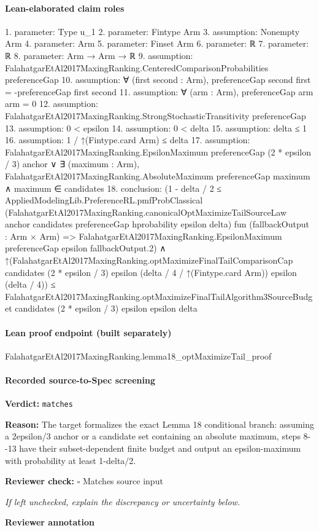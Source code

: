 \documentclass[10pt]{article}
\newcommand{\reviewerbox}{%
  \par\noindent\fbox{\parbox{0.96\linewidth}{\rule{0pt}{0.38in}}}\par
}
\newcommand{\reviewmatch}[1]{%
  \par\noindent\textbf{Reviewer check:} $\square$\; #1\par
  \noindent\emph{If left unchecked, explain the discrepancy or uncertainty below.}\par
}
\begin{document}
\paragraph{Lean-elaborated claim roles}\begin{ReviewVerbatim}
1. parameter: Type u_1
2. parameter: Fintype Arm
3. assumption: Nonempty Arm
4. parameter: Arm
5. parameter: Finset Arm
6. parameter: ℝ
7. parameter: ℝ
8. parameter: Arm → Arm → ℝ
9. assumption: FalahatgarEtAl2017MaxingRanking.CenteredComparisonProbabilities preferenceGap
10. assumption: ∀ (first second : Arm), preferenceGap second first = -preferenceGap first second
11. assumption: ∀ (arm : Arm), preferenceGap arm arm = 0
12. assumption: FalahatgarEtAl2017MaxingRanking.StrongStochasticTransitivity preferenceGap
13. assumption: 0 < epsilon
14. assumption: 0 < delta
15. assumption: delta ≤ 1
16. assumption: 1 / ↑(Fintype.card Arm) ≤ delta
17. assumption: FalahatgarEtAl2017MaxingRanking.EpsilonMaximum preferenceGap (2 * epsilon / 3) anchor ∨
  ∃ (maximum : Arm), FalahatgarEtAl2017MaxingRanking.AbsoluteMaximum preferenceGap maximum ∧ maximum ∈ candidates
18. conclusion: (1 - delta / 2 ≤
    AppliedModelingLib.PreferenceRL.pmfProbClassical
      (FalahatgarEtAl2017MaxingRanking.canonicalOptMaximizeTailSourceLaw anchor candidates preferenceGap hprobability
        epsilon delta)
      fun (fallbackOutput : Arm × Arm) =>
      FalahatgarEtAl2017MaxingRanking.EpsilonMaximum preferenceGap epsilon fallbackOutput.2) ∧
  ↑(FalahatgarEtAl2017MaxingRanking.optMaximizeFinalTailComparisonCap candidates (2 * epsilon / 3) epsilon
        (delta / 4 / ↑(Fintype.card Arm)) epsilon (delta / 4)) ≤
    FalahatgarEtAl2017MaxingRanking.optMaximizeFinalTailAlgorithm3SourceBudget candidates (2 * epsilon / 3) epsilon
      epsilon delta
\end{ReviewVerbatim}

\paragraph{Lean proof endpoint (built separately)}\begin{ReviewVerbatim}
FalahatgarEtAl2017MaxingRanking.lemma18_optMaximizeTail_proof
\end{ReviewVerbatim}

\paragraph{Recorded source-to-Spec screening}
\textbf{Verdict:} \texttt{matches}
\\
{\raggedright
\textbf{Reason:} The target formalizes the exact Lemma 18 conditional branch:\allowbreak{} assuming a 2epsilon/\allowbreak{}3 anchor or a candidate set containing an absolute maximum, steps 8-\allowbreak{}-\allowbreak{}13 have their subset-\allowbreak{}dependent finite budget and output an epsilon-\allowbreak{}maximum with probability at least 1-\allowbreak{}delta/\allowbreak{}2.\allowbreak{}
\par}
\reviewmatch{Matches source input}
\noindent\textbf{Reviewer annotation}\par
\reviewerbox
\clearpage
\hypertarget{source-claim-f54715f4dcb4708a}{}
\end{document}
